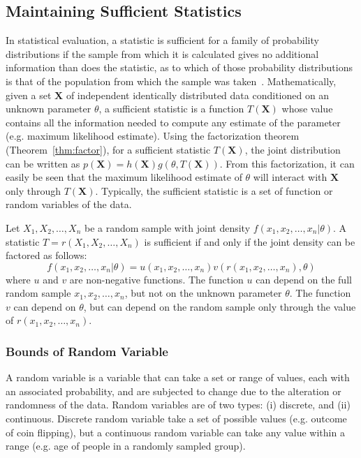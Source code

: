 \subsection{Maintaining Sufficient Statistics}
In statistical evaluation, a statistic is sufficient for a family of probability distributions if the sample from which it is calculated gives no additional information than does the statistic, as to which of those probability distributions is that of the population from which the sample was taken~\cite{fisher22:suffstat}. Mathematically, given a set  $\mathbf{X}$ of independent identically distributed data conditioned on an unknown parameter $\theta$, a sufficient statistic is a function $T(\mathbf{X})$ whose value contains all the information needed to compute any estimate of the parameter (e.g. maximum likelihood estimate). Using the factorization theorem (Theorem~\ref{thm:factor}), for a sufficient statistic $T(\mathbf{X})$, the joint distribution can be written as $ p(\mathbf{X}) = h(\mathbf{X}) g(\theta, T(\mathbf{X}))$. From this factorization, it can easily be seen that the maximum likelihood estimate of $\theta$ will interact with $\mathbf{X}$ only through $T(\mathbf{X})$. Typically, the sufficient statistic is a set of function or random variables of the data.

\begin{theorem}
    \label{thm:factor}
    Let $X_1, X_2, \dots , X_n$ be a random sample with joint density $f(x_1, x_2, \dots , x_n| \theta)$. A statistic $T = r(X_1, X_2, \dots , X_n)$ is sufficient if and only if the joint density can be factored as follows:
    \[
    f(x_1, x_2, \dots , x_n| \theta) = u(x_1, x_2, \dots , x_n) v(r(x_1, x_2, \dots , x_n), \theta)
    \]
    where $u$ and $v$ are non-negative functions. The function $u$ can depend on the full random sample $x_1, x_2, \dots , x_n$, but not on the unknown parameter $\theta$. The function $v$ can depend on $\theta$, but can depend on the random sample only through the value of $r(x_1, x_2, \dots , x_n)$.
\end{theorem}

\subsubsection{Bounds of Random Variable}
A random variable is a variable that can take a set or range of values, each with an associated probability, and are subjected to change due to the alteration or randomness of the data. Random variables are of two types: (i) discrete, and (ii) continuous. Discrete random variable take a set of possible values (e.g. outcome of coin flipping), but a continuous random variable can take any value within a range (e.g. age of people in a randomly sampled group).

